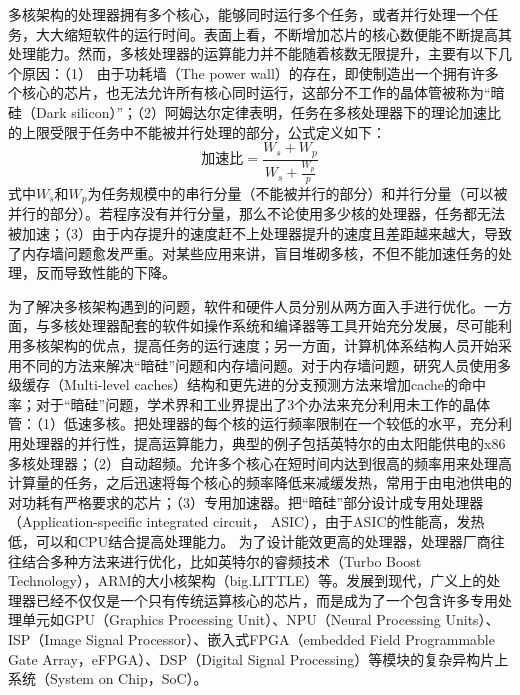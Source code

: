 多核架构的处理器拥有多个核心，能够同时运行多个任务，或者并行处理一个任务，大大缩短软件的运行时间。表面上看，不断增加芯片的核心数便能不断提高其处理能力。然而，多核处理器的运算能力并不能随着核数无限提升，主要有以下几个原因：（1） 由于功耗墙（The power wall）的存在，即使制造出一个拥有许多个核心的芯片，也无法允许所有核心同时运行\cite{dark_silicon}，这部分不工作的晶体管被称为“暗硅（Dark silicon）”；（2）阿姆达尔定律表明\cite{amdahl_law}，任务在多核处理器下的理论加速比的上限受限于任务中不能被并行处理的部分，公式定义如下：
\begin{equation}
    \label{amdahl_law}
    \text{加速比} = \frac{W_s+W_p}{W_s+ \frac{W_p}{p}}
\end{equation}
式中$W_s$和$W_p$为任务规模中的串行分量（不能被并行的部分）和并行分量（可以被并行的部分）。若程序没有并行分量，那么不论使用多少核的处理器，任务都无法被加速；（3）由于内存提升的速度赶不上处理器提升的速度且差距越来越大，导致了内存墙问题愈发严重。对某些应用来讲，盲目堆砌多核，不但不能加速任务的处理，反而导致性能的下降\cite{multicore_bad}。


为了解决多核架构遇到的问题，软件和硬件人员分别从两方面入手进行优化。一方面，与多核处理器配套的软件如操作系统和编译器等工具开始充分发展，尽可能利用多核架构的优点，提高任务的运行速度；另一方面，计算机体系结构人员开始采用不同的方法来解决“暗硅”问题和内存墙问题。对于内存墙问题，研究人员使用多级缓存（Multi-level caches）结构和更先进的分支预测方法来增加cache的命中率；对于“暗硅”问题，学术界和工业界提出了3个办法来充分利用未工作的晶体管\cite{is_dark_silicon}：（1）低速多核。把处理器的每个核的运行频率限制在一个较低的水平，充分利用处理器的并行性，提高运算能力，典型的例子包括英特尔的由太阳能供电的x86多核处理器\cite{solar_x86}；（2）自动超频。允许多个核心在短时间内达到很高的频率用来处理高计算量的任务，之后迅速将每个核心的频率降低来减缓发热，常用于由电池供电的对功耗有严格要求的芯片；（3）专用加速器。把“暗硅”部分设计成专用处理器（Application-specific integrated circuit， ASIC），由于ASIC的性能高，发热低，可以和CPU结合提高处理能力。
为了设计能效更高的处理器，处理器厂商往往结合多种方法来进行优化，比如英特尔的睿频技术（Turbo Boost Technology）\cite{intel_turbo_boost}，ARM的大小核架构（big.LITTLE）\cite{arm_big_little}等。发展到现代，广义上的处理器已经不仅仅是一个只有传统运算核心的芯片，而是成为了一个包含许多专用处理单元如GPU（Graphics Processing Unit）、NPU（Neural Processing Units）、ISP（Image Signal Processor）、嵌入式FPGA（embedded Field Programmable Gate Array，eFPGA）、DSP（Digital Signal Processing）等模块的复杂异构片上系统（System on Chip，SoC）。

